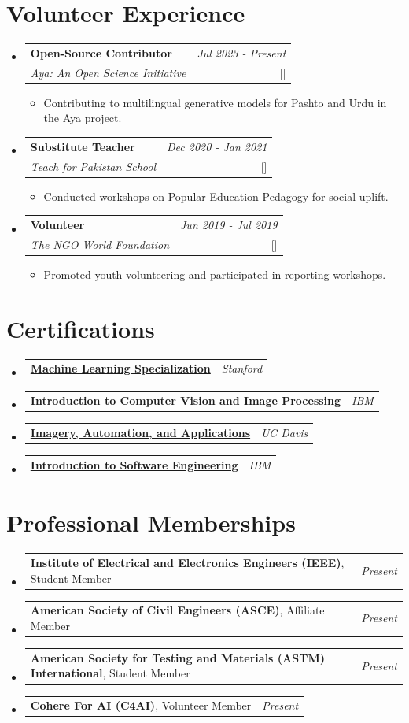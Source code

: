 \documentclass[a4paper,11pt]{article}
\makeatletter
\newcommand{\resumePOR}[3]{
\vspace{0.5mm}\item
    \begin{tabular*}{0.97\textwidth}[t]{l@{\extracolsep{\fill}}r}
        \textbf{#1}\hspace{0.3mm}#2 & \textit{\small{#3}} 
    \end{tabular*}
    \vspace{-2mm}
}
\newcommand{\resumeProject}[4]{
\vspace{0.5mm}\item
    \begin{tabular*}{0.98\textwidth}[t]{l@{\extracolsep{\fill}}r}
        \textbf{#1} & \textit{\footnotesize{#3}} \\
        \footnotesize{\textit{#2}} & \footnotesize{#4}
    \end{tabular*}
    \vspace{-2.4mm}
}
\newcommand{\resumeSubHeadingListStart}{\begin{itemize}[leftmargin=*,labelsep=1mm]}
\newcommand{\resumeItemListStart}{\begin{itemize}[leftmargin=*,labelsep=1mm,itemsep=0.5mm]}
\newcommand{\resumeSubHeadingListEnd}{\end{itemize}\vspace{2mm}}
\newcommand{\resumeItemListEnd}{\end{itemize}\vspace{-2mm}}
\makeatother
\begin{document}
\section{\textbf{Volunteer Experience}}
\vspace{-0.4mm}
\resumeSubHeadingListStart
\resumeProject
{Open-Source Contributor}{Aya: An Open Science Initiative}
{Jul 2023 - Present}
{[\href{https://aya-initiative.org}{\textcolor{darkblue}{\faIcon{globe}}}]}
\resumeItemListStart
\item Contributing to multilingual generative models for Pashto and Urdu in the Aya project.
\resumeItemListEnd
\resumeProject
{Substitute Teacher}{Teach for Pakistan School}
{Dec 2020 - Jan 2021}
{[\href{https://teachforpakistan.org}{\textcolor{darkblue}{\faIcon{globe}}}]}
\resumeItemListStart
\item Conducted workshops on Popular Education Pedagogy for social uplift.
\resumeItemListEnd
\resumeProject
{Volunteer}{The NGO World Foundation}
{Jun 2019 - Jul 2019}
{[\href{https://thengoworld.org}{\textcolor{darkblue}{\faIcon{globe}}}]}
\resumeItemListStart
\item Promoted youth volunteering and participated in reporting workshops.
\resumeItemListEnd
\resumeSubHeadingListEnd
\vspace{-6mm}
\section{\textbf{Certifications}}
\vspace{-0.4mm}
\resumeSubHeadingListStart
\resumePOR{}{\href{https://coursera.org/share/be3b8b527fbed26bd6308abac4b39c25}{\textbf{Machine Learning Specialization}}}{Stanford}
\resumePOR{}{\href{https://coursera.org/share/758d484b868071424f1b241bf4cb98c8}{\textbf{Introduction to Computer Vision and Image Processing}}}{IBM}
\resumePOR{}{\href{https://coursera.org/share/30983190c8e1b7a228efda82ed0a2fd2}{\textbf{Imagery, Automation, and Applications}}}{UC Davis}
\resumePOR{}{\href{https://coursera.org/share/f977b1188635d78d65cde11bbd2af1ca}{\textbf{Introduction to Software Engineering}}}{IBM}
\resumeSubHeadingListEnd
\vspace{-4mm}
\section{\textbf{Professional Memberships}}
\vspace{-0.4mm}
\resumeSubHeadingListStart
\resumePOR{Institute of Electrical and Electronics Engineers (IEEE)}{, Student Member}{Present}
\resumePOR{American Society of Civil Engineers (ASCE)}{, Affiliate Member}{Present}
\resumePOR{American Society for Testing and Materials (ASTM) International}{, Student Member}{Present}
\resumePOR{Cohere For AI (C4AI)}{, Volunteer Member}{Present}
\resumeSubHeadingListEnd
\vspace{-4mm}
\end{document}
